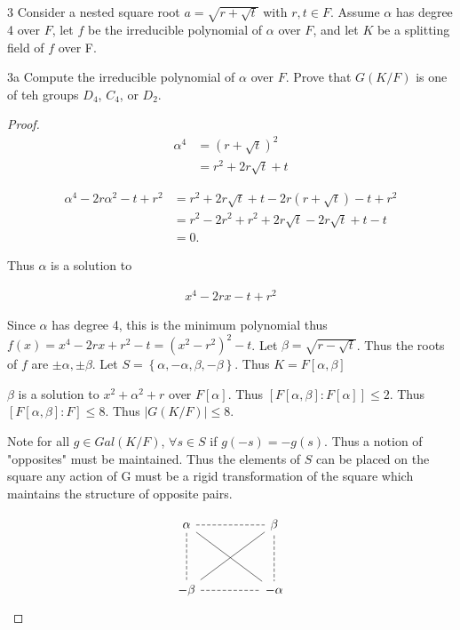 \documentclass{article}
\begin{document}
\begin{PROB}{3}\label{Problem 3.}
    Consider a nested square root $a = \sqrt{r + \sqrt{t}}$ with $r, t \in F$. Assume $\alpha$ has degree 4 over $F$, let $f$ be the irreducible polynomial of $\alpha$ over $F$, and let $K$ be a splitting field of $f$ over F.       
\end{PROB}
\begin{PROB}{3a}\label{Problem 3a.}
    Compute the irreducible polynomial of $\alpha$ over $F$. Prove that $G(K / F)$ is one of teh groups $D_4$, $C_4$, or $D_2$.      
\end{PROB}
\begin{proof}
    \begin{align*}
        \alpha^4 &= (r + \sqrt{t})^{2} \\
        &= r^2 + 2r\sqrt{t} + t
    \end{align*}

    \begin{align*}
        \alpha^4 -  2r\alpha^2 - t + r^2 &= r^2 + 2r\sqrt{t} + t - 2r(r + \sqrt{t}) - t + r^2 \\
        &= r^2 - 2r^2 +r^2  +2r\sqrt{t} - 2r\sqrt{t} + t - t \\
        &= 0.
    \end{align*}

    Thus $\alpha$ is a solution to 
    
    \begin{align*}
        x^4 - 2rx - t +r^2
    \end{align*}

    Since $\alpha$ has degree 4, this is the minimum polynomial thus $f(x) = x^4 - 2rx + r^2 - t = (x^2 - r^2)^2 - t$. Let $\beta = \sqrt{r - \sqrt{t}}$. Thus the roots of $f$ are $\pm \alpha, \pm \beta$. Let $S = \left\{ \alpha, -\alpha, \beta, -\beta \right\}$. Thus $K = F[\alpha, \beta]$ 
    

    $\beta$ is a solution to $x^2 + \alpha^2 + r$ over $F[\alpha]$. Thus $[F[\alpha, \beta] : F[\alpha]] \leq 2$. Thus $[F[\alpha, \beta] : F] \leq 8$. Thus $|G(K / F)| \leq 8$.           
    
    
    Note for all $g \in Gal(K / F)$, $\forall s \in S$ if $g(-s) = -g(s)$. Thus a notion of "opposites" must be maintained. Thus the elements of $S$ can be placed on the square any action of G must be a rigid transformation of the square which maintains the structure of opposite pairs. 
    
    \[\begin{tikzcd}
        \alpha && {\beta} \\
        \\
        {-\beta} && {-\alpha}
        \arrow[dashed, no head, from=1-1, to=1-3]
        \arrow[dashed, no head, from=1-1, to=3-1]
        \arrow[no head, from=1-1, to=3-3]
        \arrow[dashed, no head, from=1-3, to=3-3]
        \arrow[no head, from=3-1, to=1-3]
        \arrow[dashed, no head, from=3-1, to=3-3]
    \end{tikzcd}\]


\end{proof}
\end{document}
